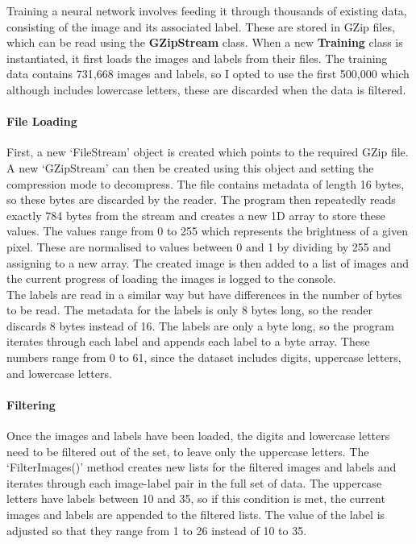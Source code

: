 \documentclass{article}
\begin{document}
Training a neural network involves feeding it through thousands of existing data, consisting of the image and its associated label. These are stored in GZip files, which can be read using the \textbf{GZipStream} class. When a new \textbf{Training} class is instantiated, it first loads the images and labels from their files. The training data contains 731,668 images and labels, so I opted to use the first 500,000 which although includes lowercase letters, these are discarded when the data is filtered.

\paragraph{File Loading\\}

First, a new `FileStream' object is created which points to the required GZip file. A new `GZipStream' can then be created using this object and setting the compression mode to decompress. The file contains metadata of length 16 bytes, so these bytes are discarded by the reader. The program then repeatedly reads exactly 784 bytes from the stream and creates a new 1D array to store these values. The values range from 0 to 255 which represents the brightness of a given pixel. These are normalised to values between 0 and 1 by dividing by 255 and assigning to a new array. The created image is then added to a list of images and the current progress of loading the images is logged to the console. \\

The labels are read in a similar way but have differences in the number of bytes to be read. The metadata for the labels is only 8 bytes long, so the reader discards 8 bytes instead of 16. The labels are only a byte long, so the program iterates through each label and appends each label to a byte array. These numbers range from 0 to 61, since the dataset includes digits, uppercase letters, and lowercase letters.

\paragraph{Filtering\\}

Once the images and labels have been loaded, the digits and lowercase letters need to be filtered out of the set, to leave only the uppercase letters. The `FilterImages()' method creates new lists for the filtered images and labels and iterates through each image-label pair in the full set of data. The uppercase letters have labels between 10 and 35, so if this condition is met, the current images and labels are appended to the filtered lists. The value of the label is adjusted so that they range from 1 to 26 instead of 10 to 35.
\end{document}
